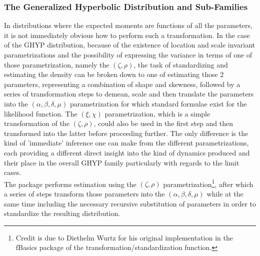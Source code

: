 \subsubsection{The Generalized Hyperbolic Distribution and Sub-Families}\label{ghyp}
In distributions where the expected moments are functions of all the parameters,
it is not immediately obvious how to perform such a transformation. In the case
of the GHYP distribution, because of the existence of location and scale
invariant parametrizations and the possibility of expressing the variance in
terms of one of those parametrization, namely the $(\zeta, \rho)$, the task of
standardizing and estimating the density can be broken down to one of estimating
those 2 parameters, representing a combination of shape and skewness, followed
by a series of transformation steps to demean, scale and then translate the
parameters into the $(\alpha, \beta, \delta, \mu)$ parametrization for which
standard formulae exist for the likelihood function. The $(\xi, \chi)$
parametrization, which is a simple transformation of the $(\zeta, \rho)$,
could also be used in the first step and then transformed into the latter before
proceeding further. The only difference is the kind of 'immediate' inference one
can make from the different parametrizations, each providing a different direct
insight into the kind of dynamics produced and their place in the overall GHYP
family particularly with regards to the limit cases.\\
The \verb@rugarch@ package performs estimation using the $(\zeta, \rho)$
parametrization\footnote{Credit is due to Diethelm Wurtz for his original
implementation in the fBasics package of the transformation/standardization
function.}, after which a series of steps transform those parameters into
the $(\alpha, \beta, \delta, \mu)$ while at the same time including the
necessary recursive substitution of parameters in order to standardize the
resulting distribution.
